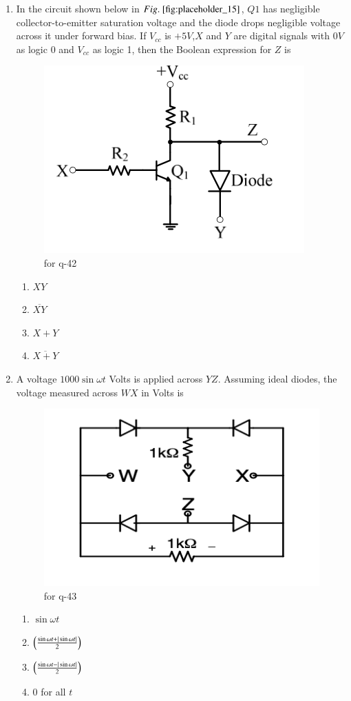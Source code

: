\documentclass[journal,12pt,onecolumn]{IEEEtran}
\theoremstyle{remark}
\begin{document}
\begin{enumerate}
\item In the circuit shown below in $\figref{fig:placeholder_15}$, $Q1$ has negligible collector-to-emitter saturation voltage and the diode drops negligible voltage across it under forward bias. If $V_{cc}$ is $+5 V$,$ X$ and $Y$ are digital signals with $0 V$ as logic $0$ and $V_{cc}$ as logic 1, then the Boolean expression for $Z$ is
\begin{figure}[H]
    \centering
    \includegraphics[width=0.5\columnwidth]{figs/fig_15.png}
    \caption{for q-42}
    \label{fig:placeholder_15}
\end{figure}
\begin{multicols}{4}
\begin{enumerate}
\item $XY$
\item $\overline{XY}$
\item $X + Y$
\item $\overline{X + Y}$
\end{enumerate}
\end{multicols}
\hfill {}

\item A voltage $1000 \sin \omega t$ Volts is applied across $YZ$. Assuming ideal diodes, the voltage measured across $WX$ in Volts is
\begin{figure}[H]
    \centering
    \includegraphics[width=0.5\columnwidth]{figs/fig_16.png}
    \caption{for q-43}
    \label{fig:placeholder_16}
\end{figure}
\begin{multicols}{2}
\begin{enumerate}
\item $\sin \omega t$
\item $\left(\frac{\sin \omega t + |\sin \omega t|}{2}\right)$
\item $\left(\frac{\sin \omega t - |\sin \omega t|}{2}\right)$
\item 0 for all $t$
\end{enumerate}
\end{multicols}
\hfill {}


\end{enumerate}
\end{document}
